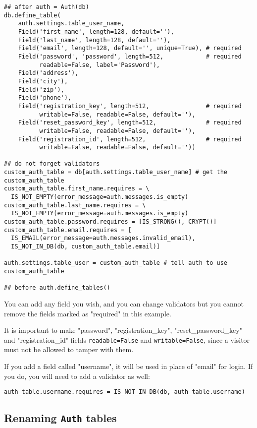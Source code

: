 \documentclass[justified,sixbynine,notoc]{tufte-book}
\def\ft{\small\tt}
\begin{document}
\begin{fullwidth}
\begin{lstlisting}
## after auth = Auth(db)
db.define_table(
    auth.settings.table_user_name,
    Field('first_name', length=128, default=''),
    Field('last_name', length=128, default=''),
    Field('email', length=128, default='', unique=True), # required
    Field('password', 'password', length=512,            # required
          readable=False, label='Password'),
    Field('address'),
    Field('city'),
    Field('zip'),
    Field('phone'),
    Field('registration_key', length=512,                # required
          writable=False, readable=False, default=''),
    Field('reset_password_key', length=512,              # required
          writable=False, readable=False, default=''),
    Field('registration_id', length=512,                 # required
          writable=False, readable=False, default=''))

## do not forget validators
custom_auth_table = db[auth.settings.table_user_name] # get the custom_auth_table
custom_auth_table.first_name.requires = \
  IS_NOT_EMPTY(error_message=auth.messages.is_empty)
custom_auth_table.last_name.requires = \
  IS_NOT_EMPTY(error_message=auth.messages.is_empty)
custom_auth_table.password.requires = [IS_STRONG(), CRYPT()]
custom_auth_table.email.requires = [
  IS_EMAIL(error_message=auth.messages.invalid_email),
  IS_NOT_IN_DB(db, custom_auth_table.email)]

auth.settings.table_user = custom_auth_table # tell auth to use custom_auth_table

## before auth.define_tables()
\end{lstlisting}

You can add any field you wish, and you can change validators but you cannot remove
the fields marked as "required" in this example.

It is important to make "password", "registration\_key", "reset\_password\_key" and "registration\_id" fields {\ft readable=False} and {\ft writable=False}, since a visitor must not be allowed to tamper with them.

If you add a field called "username", it will be used in place of "email" for login. If you do, you will need to add a validator as well:
\begin{lstlisting}
auth_table.username.requires = IS_NOT_IN_DB(db, auth_table.username)
\end{lstlisting}

\goodbreak\subsection{Renaming {\ft Auth} tables}


\end{fullwidth}
\end{document}
